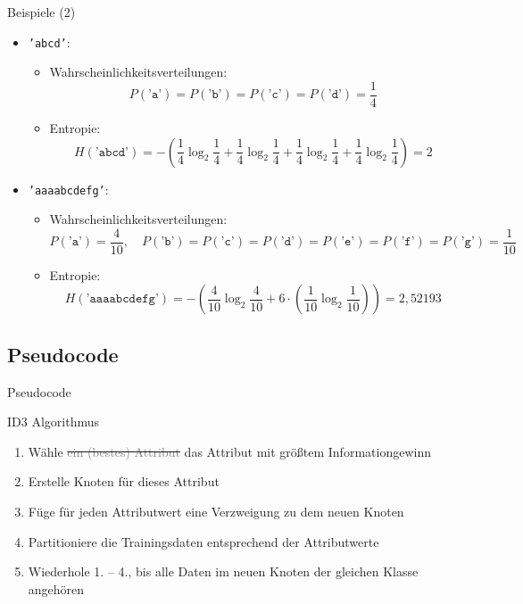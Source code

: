 \begin{frame}{Beispiele (2)}

\begin{itemize}[<+->]
   \item \texttt{'abcd'}: 
        \begin{itemize}[<+->]
            \item Wahrscheinlichkeitsverteilungen: 
            \[P(\texttt{'a'}) = P(\texttt{'b'}) = P(\texttt{'c'}) = P(\texttt{'d'}) = \frac{1}{4}\]        
            \item Entropie:
    \[H(\texttt{'abcd'}) = - \left( \frac{1}{4} \log_2 \frac{1}{4} + \frac{1}{4} \log_2 \frac{1}{4} + \frac{1}{4} \log_2 \frac{1}{4} + \frac{1}{4} \log_2 \frac{1}{4} \right) = 2 \]
        \end{itemize} 
    \item \texttt{'aaaabcdefg'}: 
        \begin{itemize}[<+->]
            \item Wahrscheinlichkeitsverteilungen: 
            \[P(\texttt{'a'}) = \frac{4}{10}, \quad P(\texttt{'b'}) = P(\texttt{'c'}) = P(\texttt{'d'}) = P(\texttt{'e'}) = P(\texttt{'f'}) = P(\texttt{'g'}) = \frac{1}{10}\]        
            \item Entropie:
    \[H(\texttt{'aaaabcdefg'}) = - \left( \frac{4}{10} \log_2 \frac{4}{10} + 6 \cdot \left( \frac{1}{10} \log_2 \frac{1}{10} \right) \right) = 2{,}52193 \]
        \end{itemize}
\end{itemize} 
\end{frame}



\subsection{Pseudocode}
\begin{frame}{Pseudocode}
\begin{algorithm}[H]
\caption{ID3 Algorithmus}
\begin{enumerate}
    \item Wähle \sout{\textcolor{gray}{ein (bestes) Attribut}} das Attribut mit größtem Informationgewinn
    \item Erstelle Knoten für dieses Attribut
    \item Füge für jeden Attributwert eine Verzweigung zu dem neuen Knoten
    \item Partitioniere die Trainingsdaten entsprechend der Attributwerte
    \item Wiederhole \textcolor{ohmblue}{1.} -- \textcolor{ohmblue}{4.}, bis alle Daten im neuen Knoten der gleichen Klasse angehören
\end{enumerate}
\end{algorithm}
\end{frame}

